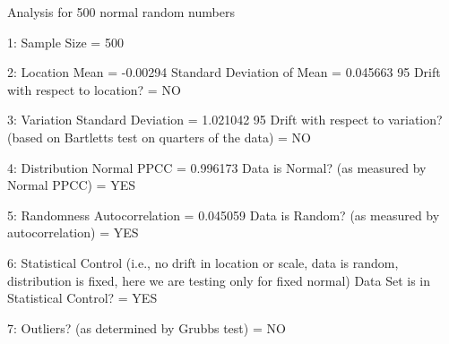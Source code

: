   
  
 Analysis for 500 normal random numbers
  
 1: Sample Size                           = 500
  
 2: Location
    Mean                                  = -0.00294
    Standard Deviation of Mean            = 0.045663
    95%
    Drift with respect to location?       = NO
  
 3: Variation
    Standard Deviation                    = 1.021042
    95%
    Drift with respect to variation?
    (based on Bartletts test on quarters
    of the data)                          = NO
  
 4: Distribution
    Normal PPCC                           = 0.996173
    Data is Normal?
      (as measured by Normal PPCC)        = YES
  
 5: Randomness
    Autocorrelation                       = 0.045059
    Data is Random?
      (as measured by autocorrelation)    = YES
  
 6: Statistical Control
    (i.e., no drift in location or scale,
    data is random, distribution is 
    fixed, here we are testing only for
    fixed normal)
    Data Set is in Statistical Control?   = YES
  
 7: Outliers?
    (as determined by Grubbs test)        = NO
  
